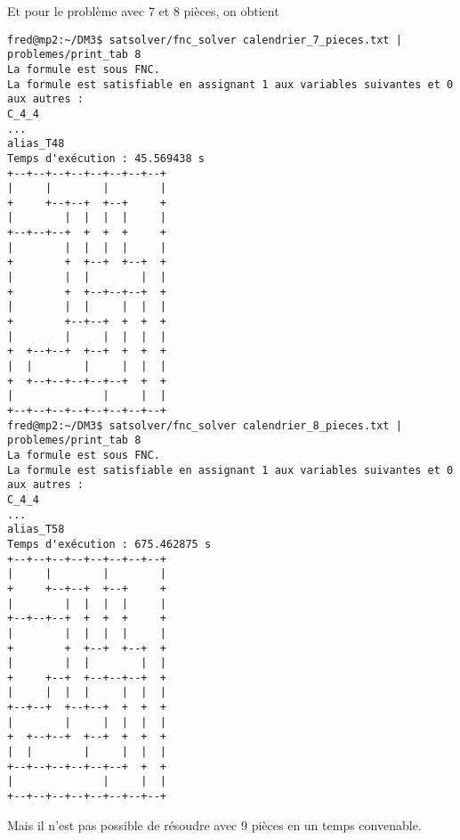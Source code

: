 Et pour le problème avec 7 et 8 pièces, on obtient
\begin{lstlisting}
fred@mp2:~/DM3$ satsolver/fnc_solver calendrier_7_pieces.txt | problemes/print_tab 8
La formule est sous FNC.
La formule est satisfiable en assignant 1 aux variables suivantes et 0 aux autres :
C_4_4
...
alias_T48
Temps d'exécution : 45.569438 s
+--+--+--+--+--+--+--+--+
|     |        |        |
+     +--+--+  +--+     +
|        |  |  |  |     |
+--+--+--+  +  +  +     +
|        |  |  |  |     |
+        +  +--+  +--+  +
|        |  |        |  |
+        +  +--+--+--+  +
|        |  |     |  |  |
+        +--+--+  +  +  +
|        |     |  |  |  |
+  +--+--+  +--+  +  +  +
|  |        |     |  |  |
+  +--+--+--+--+--+  +  +
|              |     |  |
+--+--+--+--+--+--+--+--+
fred@mp2:~/DM3$ satsolver/fnc_solver calendrier_8_pieces.txt | problemes/print_tab 8
La formule est sous FNC.
La formule est satisfiable en assignant 1 aux variables suivantes et 0 aux autres :
C_4_4
...
alias_T58
Temps d'exécution : 675.462875 s
+--+--+--+--+--+--+--+--+
|     |        |        |
+     +--+--+  +--+     +
|        |  |  |  |     |
+--+--+--+  +  +  +     +
|        |  |  |  |     |
+        +  +--+  +--+  +
|        |  |        |  |
+     +--+  +--+--+--+  +
|     |  |  |     |  |  |
+--+--+  +--+--+  +  +  +
|        |     |  |  |  |
+  +--+--+  +--+  +  +  +
|  |        |     |  |  |
+--+--+--+--+--+--+  +  +
|              |     |  |
+--+--+--+--+--+--+--+--+
\end{lstlisting}

Mais il n'est pas possible de résoudre avec 9 pièces en un temps convenable.


